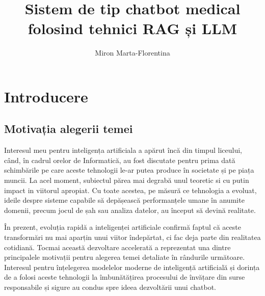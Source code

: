 \documentclass[12pt, a4paper, oneside, romanian]{teza-upb}
\begin{document}
\author{Miron Marta-Florentina}

\title{Sistem de tip chatbot medical folosind tehnici RAG și LLM}




\beforepreface
\listoffigures
\listoftables
{}
\afterpreface 

\chapter*{Introducere}
\section{Motivația alegerii temei}

Interesul meu pentru inteligența artificiala a apărut încă din timpul liceului, când, în cadrul orelor de Informatică, au fost discutate pentru prima dată schimbările pe care aceste tehnologii le-ar putea produce în societate și pe piața muncii. La acel moment, subiectul părea mai degrabă unul teoretic si cu putin impact in viitorul apropiat. Cu toate acestea, pe măsură ce tehnologia a evoluat, ideile despre sisteme capabile să depășească performanțele umane în anumite domenii, precum jocul de șah sau analiza datelor, au început să devină realitate.

În prezent, evoluția rapidă a inteligenței artificiale confirmă faptul că aceste transformări nu mai aparțin unui viitor îndepărtat, ci fac deja parte din realitatea cotidiană. Tocmai această dezvoltare accelerată a reprezentat una dintre principalele motivații pentru alegerea temei detaliate în rândurile următoare. Interesul pentru înțelegerea modelelor moderne de inteligență artificială și dorința de a folosi aceste tehnologii la îmbunătățirea procesului de învățare din surse responsabile și sigure au condus spre ideea dezvoltării unui chatbot.
\end{document}
